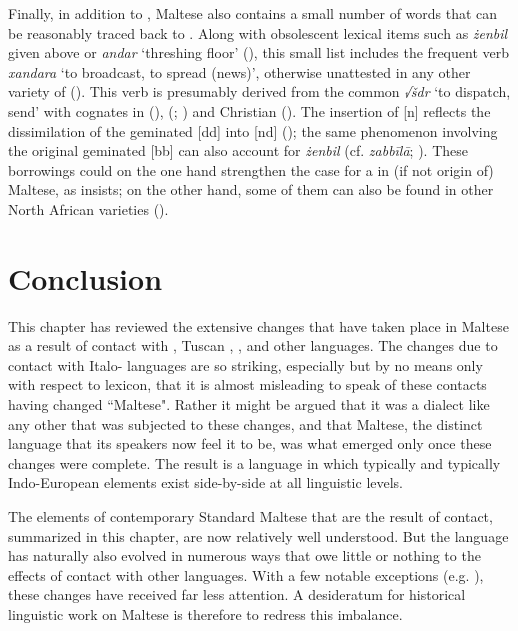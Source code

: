 \documentclass[output=paper]{langsci/langscibook}
\begin{document}
Finally, in addition to , Maltese also contains a small number of words that can be reasonably traced back to . Along with obsolescent lexical items such as \textit{żenbil} given above or \textit{andar} `threshing floor' (\citealt[116--117]{Behnstedt2005}), this small list includes the frequent verb \textit{xandara} `to broadcast, to spread (news)', otherwise unattested in any other variety of  (\citealt[46]{Borg1996}). This verb is presumably derived from the common   \textit{√šdr} `to dispatch, send' with cognates in  (\citealt[450]{manddic1963}),  (; \citealt[1112-1113]{sokoloff2002}) and Christian  (\citealt[1179]{Khan2008}). The insertion of [n] reflects the dissimilation of the geminated [dd] into [nd] (\citealt[175--176]{Lipinski1997}); the same phenomenon involving the original geminated [bb] can also account for \textit{żenbil} (cf.  \textit{zabbīlā}; \citealt[397]{sokoloff2002}). These borrowings could on the one hand strengthen the case for a   in (if not origin of) Maltese, as \cite{Borg1996} insists; on the other hand, some of them can also be found in other North African varieties (\citealt{Behnstedt2005}).

\section{Conclusion}
This chapter has reviewed the extensive changes that have taken place in Maltese as a result of contact with , Tuscan , , and other languages. The changes due to contact with Italo- languages are so striking, especially but by no means only with respect to lexicon, that it is almost misleading to speak of these contacts having changed ``Maltese". Rather it might be argued that it was a   dialect like any other that was subjected to these changes, and that Maltese, the distinct language that its speakers now feel it to be, was what emerged only once these changes were complete. The result is a language in which typically  and typically Indo-European elements exist side-by-side at all linguistic levels.

The elements of contemporary  Standard Maltese that are the result of contact, summarized in this chapter, are now relatively well understood. But the language has naturally also evolved in numerous ways that owe little or nothing to the effects of contact with other languages. With a few notable exceptions (e.g. \citealt{Borg1978,Vanhove1993}), these changes have received far less attention. A desideratum for  historical linguistic work on Maltese is therefore to redress this imbalance.
\end{document}
